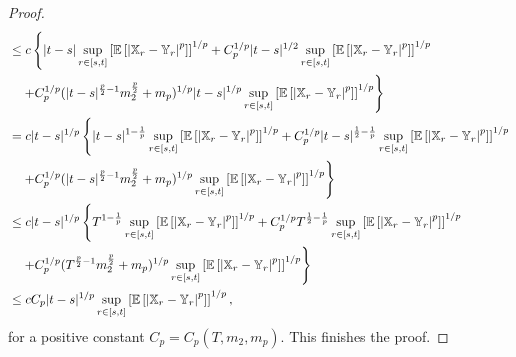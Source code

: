 \documentclass[11pt]{article}
\theoremstyle{theorem}
\theoremstyle{definition}
\newcommand{\1}{{\bf 1}}
\begin{document}
\begin{proof}
\begin{align*}
 & \le c \left\{ |t-s|\sup_{r\in [s, t]} \left[ \mathbb{E} \left[ \left| \mathbb{X}_r-\mathbb{Y}_r \right|^p \right]\right]^{1/p} + C_{p}^{1/p}|t-s|^{1/2} \sup_{r\in [s, t]}  \left[ \mathbb{E} \left[ \left| \mathbb{X}_r-\mathbb{Y}_r \right|^p \right]\right]^{1/p} \right. \notag \\
 & \quad \left. +  C_{p}^{1/p} (|t-s|^{\frac{p}{2}-1}m_2^{\frac{p}{2}}+m_p )^{1/p}|t-s|^{1/p} \sup_{r\in [s, t]} \left[ \mathbb{E} \left[ \left| \mathbb{X}_r-\mathbb{Y}_r \right|^p \right]\right]^{1/p} \right\} \notag\\
  &= c |t-s|^{1/p} \left\{ |t-s|^{1-\frac{1}{p}}\sup_{r\in [s, t]} \left[ \mathbb{E} \left[ \left| \mathbb{X}_r-\mathbb{Y}_r \right|^p \right]\right]^{1/p} + C_{p}^{1/p}|t-s|^{\frac{1}{2}-\frac{1}{p}} \sup_{r\in [s, t]}  \left[ \mathbb{E} \left[ \left| \mathbb{X}_r-\mathbb{Y}_r \right|^p \right]\right]^{1/p} \right. \notag \\
 & \quad \left. +   C_{p}^{1/p} (|t-s|^{\frac{p}{2}-1}m_2^{\frac{p}{2}}+m_p )^{1/p} \sup_{r\in [s, t]} \left[ \mathbb{E} \left[ \left| \mathbb{X}_r-\mathbb{Y}_r \right|^p \right]\right]^{1/p} \right\} \notag\\
  &\leq c |t-s|^{1/p} \left\{ T^{1-\frac{1}{p}}\sup_{r\in [s, t]} \left[ \mathbb{E} \left[ \left| \mathbb{X}_r-\mathbb{Y}_r \right|^p \right]\right]^{1/p} + C_{p}^{1/p} T^{\frac{1}{2}-\frac{1}{p}} \sup_{r\in [s, t]}  \left[ \mathbb{E} \left[ \left| \mathbb{X}_r-\mathbb{Y}_r \right|^p \right]\right]^{1/p} \right. \notag \\
 & \quad \left. +   C_{p}^{1/p} (T^{\frac{p}{2}-1}m_2^{\frac{p}{2}}+m_p )^{1/p} \sup_{r\in [s, t]} \left[ \mathbb{E} \left[ \left| \mathbb{X}_r-\mathbb{Y}_r \right|^p \right]\right]^{1/p} \right\} \notag\\
& \le c  C_p  |t-s|^{1/p} \sup_{r\in [s, t]} \left[ \mathbb{E} \left[ \left| \mathbb{X}_r-\mathbb{Y}_r \right|^p \right]\right]^{1/p},
\end{align*}
for a positive constant $C_p=C_p(T, m_2, m_p)$. This finishes the proof.
\end{proof}
\end{document}
